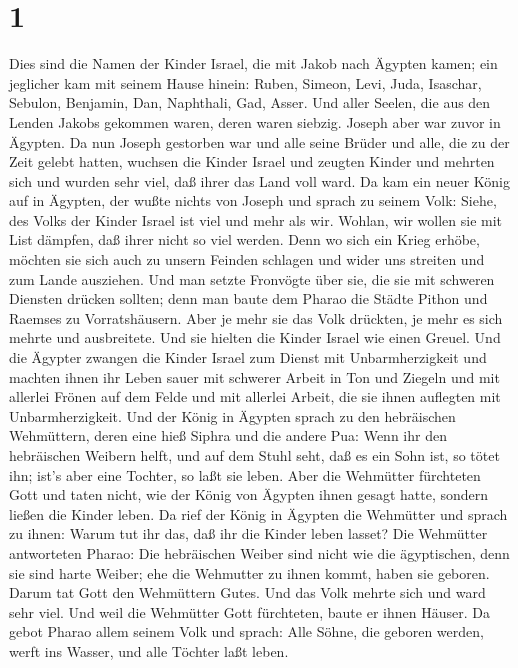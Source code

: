 \hypertarget{section}{%
\section{1}\label{section}}

 Dies sind die Namen der Kinder Israel, die mit Jakob nach
Ägypten kamen; ein jeglicher kam mit seinem Hause hinein: 
Ruben, Simeon, Levi, Juda,  Isaschar, Sebulon, Benjamin,
 Dan, Naphthali, Gad, Asser.  Und aller Seelen,
die aus den Lenden Jakobs gekommen waren, deren waren siebzig. Joseph
aber war zuvor in Ägypten.  Da nun Joseph gestorben war und
alle seine Brüder und alle, die zu der Zeit gelebt hatten, 
wuchsen die Kinder Israel und zeugten Kinder und mehrten sich und wurden
sehr viel, daß ihrer das Land voll ward.  Da kam ein neuer
König auf in Ägypten, der wußte nichts von Joseph  und
sprach zu seinem Volk: Siehe, des Volks der Kinder Israel ist viel und
mehr als wir.  Wohlan, wir wollen sie mit List dämpfen, daß
ihrer nicht so viel werden. Denn wo sich ein Krieg erhöbe, möchten sie
sich auch zu unsern Feinden schlagen und wider uns streiten und zum
Lande ausziehen.  Und man setzte Fronvögte über sie, die
sie mit schweren Diensten drücken sollten; denn man baute dem Pharao die
Städte Pithon und Raemses zu Vorratshäusern.  Aber je mehr
sie das Volk drückten, je mehr es sich mehrte und ausbreitete. Und sie
hielten die Kinder Israel wie einen Greuel.  Und die
Ägypter zwangen die Kinder Israel zum Dienst mit Unbarmherzigkeit
 und machten ihnen ihr Leben sauer mit schwerer Arbeit in
Ton und Ziegeln und mit allerlei Frönen auf dem Felde und mit allerlei
Arbeit, die sie ihnen auflegten mit Unbarmherzigkeit.  Und
der König in Ägypten sprach zu den hebräischen Wehmüttern, deren eine
hieß Siphra und die andere Pua:  Wenn ihr den hebräischen
Weibern helft, und auf dem Stuhl seht, daß es ein Sohn ist, so tötet
ihn; ist's aber eine Tochter, so laßt sie leben.  Aber die
Wehmütter fürchteten Gott und taten nicht, wie der König von Ägypten
ihnen gesagt hatte, sondern ließen die Kinder leben.  Da
rief der König in Ägypten die Wehmütter und sprach zu ihnen: Warum tut
ihr das, daß ihr die Kinder leben lasset?  Die Wehmütter
antworteten Pharao: Die hebräischen Weiber sind nicht wie die
ägyptischen, denn sie sind harte Weiber; ehe die Wehmutter zu ihnen
kommt, haben sie geboren.  Darum tat Gott den Wehmüttern
Gutes. Und das Volk mehrte sich und ward sehr viel.  Und
weil die Wehmütter Gott fürchteten, baute er ihnen Häuser. 
Da gebot Pharao allem seinem Volk und sprach: Alle Söhne, die geboren
werden, werft ins Wasser, und alle Töchter laßt leben.

